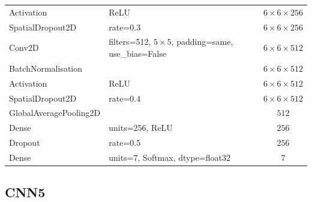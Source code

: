 \documentclass[12pt, a4paper]{report}
\let\oldsubsection\subsection
\renewcommand{\subsection}{%
    \Needspace{6\baselineskip}%
    \oldsubsection
}
\begin{document}
\begin{longtable}{lp{6cm}c}
					Activation & ReLU & $6\times6\times256$ \\
					SpatialDropout2D & rate=0.3 & $6\times6\times256$ \\
					Conv2D & filters=512, $5\times5$, padding=same, use\_bias=False & $6\times6\times512$ \\
					BatchNormalisation &  & $6\times6\times512$ \\
					Activation & ReLU & $6\times6\times512$ \\
					SpatialDropout2D & rate=0.4 & $6\times6\times512$ \\
					GlobalAveragePooling2D &  & $512$ \\
					Dense & units=256, ReLU & $256$ \\
					Dropout & rate=0.5 & $256$ \\
					Dense & units=7, Softmax, dtype=float32 & $7$ \\
				\end{longtable}
			
			\subsection{CNN5}
			
\end{document}
